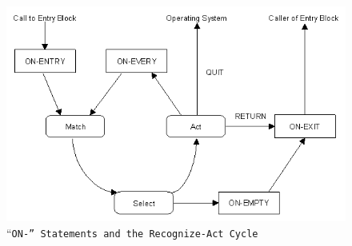 \begin{figure}
  \centering
  \includegraphics[scale=0.7]{f5-2}
  \caption{``\tt{ON-}'' Statements and the Recognize-Act Cycle}
  \label{f:5-2}
\end{figure}

